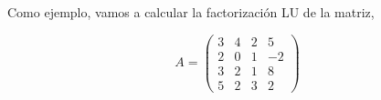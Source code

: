  

\begin{paracol}{2}
Como ejemplo, vamos a calcular la factorización LU de la matriz,
\end{paracol}
\begin{equation*}
A=\begin{pmatrix}
3& 4& 2&5\\
2& 0& 1& -2\\
3& 2& 1& 8\\
5& 2& 3& 2
\end{pmatrix} 
\end{equation*}
 
 
 


